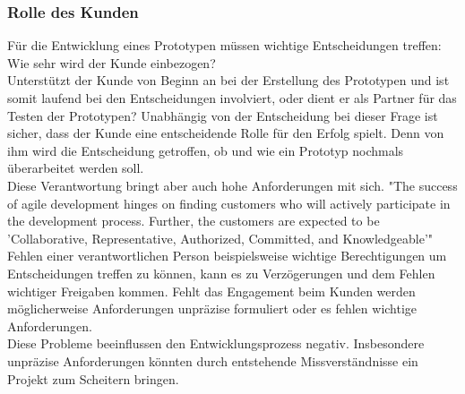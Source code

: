 \documentclass[a4paper,12pt,top=2.5cm,bottom=2.5cm, left=2.5cm, right=2.5cm, numbers=noenddot]{scrartcl}
\begin{document}
\subsubsection{Rolle des Kunden}
Für die Entwicklung eines Prototypen müssen wichtige Entscheidungen treffen: Wie sehr wird der Kunde einbezogen?
\\Unterstützt der Kunde von Beginn an bei der Erstellung des Prototypen und ist somit laufend bei den Entscheidungen involviert, oder dient er als Partner für das Testen der Prototypen? 
Unabhängig von der Entscheidung bei dieser Frage ist sicher, dass der Kunde eine entscheidende Rolle für den Erfolg spielt. Denn von ihm wird die Entscheidung getroffen, ob und wie ein Prototyp nochmals überarbeitet werden soll. \\
Diese Verantwortung bringt aber auch hohe Anforderungen mit sich. 
"The success of agile development hinges on finding customers who will actively participate in the development process. Further, the customers are expected to be 'Collaborative, Representative, Authorized, Committed, and Knowledgeable'" \cite{10.1145/1060710.1060712}\\
Fehlen einer verantwortlichen Person beispielsweise wichtige Berechtigungen um Entscheidungen treffen zu können, kann es zu Verzögerungen und dem Fehlen wichtiger Freigaben kommen. Fehlt das Engagement beim Kunden werden möglicherweise Anforderungen unpräzise formuliert oder es fehlen wichtige Anforderungen. \\
Diese Probleme beeinflussen den Entwicklungsprozess negativ. Insbesondere unpräzise Anforderungen könnten durch entstehende Missverständnisse ein Projekt zum Scheitern bringen. %
\end{document}
